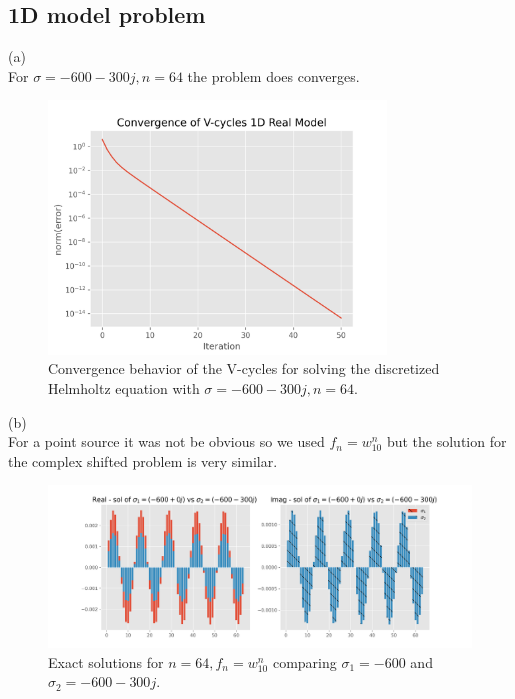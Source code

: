 \documentclass[a4paper,12pt]{article}
\begin{document}
\subsection{1D model problem}
(a) \\
For $\sigma = -600-300j, n = 64$ the problem does converges.
\begin{figure}[h!]
    \centering
    \includegraphics[width=0.8\textwidth]{../code/plts/convergence_1Dcomplex.png}
    \caption{
        Convergence behavior of the V-cycles for solving
        the discretized Helmholtz equation with $\sigma = -600-300j, n = 64$.
    }
    \label{fig:1Dcomplex}
\end{figure}

(b)\\
For a point source it was not be obvious so we used $f_{n} = w_{10}^{n}$ but the solution
for the complex shifted problem is very similar.

\begin{figure}[h!]
    \centering
    \hspace*{-1.55cm}
    \includegraphics[width=1.2\textwidth]{../code/plts/exact_1Dcomplex.png}
    \caption{Exact solutions for $n=64,  f_{n}= w_{10}^{n}$ comparing $\sigma_{1} = -600$ and $\sigma_{2} =-600-300j$.}
    \label{fig: exact 1D complex}
\end{figure}
\end{document}
